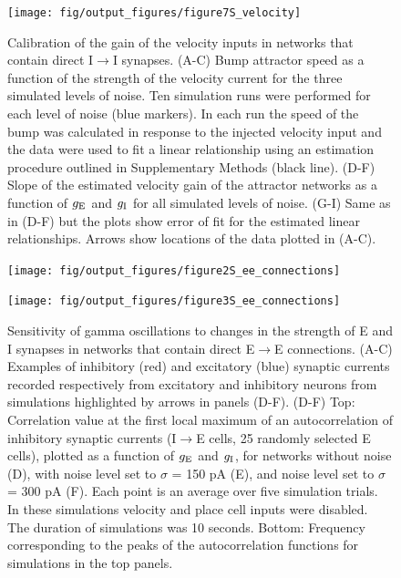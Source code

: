 \documentclass[a4paper,12pt]{article}
\newcommand{\ssc}[3]{\ensuremath{#1_{\text{#2}_{\text{#3}}}}}
\newcommand{\gE      }{\ssc{g}      {\scriptsize{E}}{}}
\newcommand{\gI      }{\ssc{g}      {\scriptsize{I}}{}}
\begin{document}
\clearpage

\begin{figure}[ht!]
    \internallinenumbers
    \centering
        \texttt{[image: fig/output\_figures/figure7S\_velocity]}
    \caption{Calibration of the gain of the velocity inputs in networks that
    contain direct I$\rightarrow$I synapses. (A-C) Bump attractor speed as a
    function of the strength of the velocity current for the three simulated
    levels of noise. Ten simulation runs were performed for each level of noise
    (blue markers). In each run the speed of the bump was calculated in
    response to the injected velocity input and the data were used to fit a
    linear relationship using an estimation procedure outlined in Supplementary
    Methods (black line). (D-F) Slope of the estimated velocity gain of the
    attractor networks as a function of $\gE$ and $\gI$ for all simulated
    levels of noise. (G-I) Same as in (D-F) but the plots show error of fit for
    the estimated linear relationships. Arrows show locations of the data
    plotted in (A-C).}
\end{figure}

\clearpage

\begin{figure}[p]
    \internallinenumbers
    \centering
        \texttt{[image: fig/output\_figures/figure2S\_ee\_connections]}
    \caption{}
\end{figure}

\clearpage

\begin{figure}[p]
    \internallinenumbers
    \centering
        \texttt{[image: fig/output\_figures/figure3S\_ee\_connections]}
\end{figure}

\clearpage

\begin{figure}[H]
    \internallinenumbers
    \caption{Sensitivity of gamma oscillations to changes in the strength of E
    and I synapses in networks that contain direct E$\rightarrow$E connections.
    (A-C) Examples of inhibitory (red) and excitatory (blue) synaptic currents
    recorded respectively from excitatory and inhibitory neurons from
    simulations highlighted by arrows in panels (D-F).  (D-F) Top: Correlation
    value at the first local maximum of an autocorrelation of inhibitory
    synaptic currents (I$\rightarrow$E cells, 25 randomly selected E cells),
    plotted as a function of $\gE$ and $\gI$, for networks without noise (D), with
    noise level set to $\sigma$ = 150 pA (E), and noise level set to $\sigma$ =
    300 pA (F). Each point is an average over five simulation trials. In these
    simulations velocity and place cell inputs were disabled.  The duration of
    simulations was 10 seconds.  Bottom: Frequency corresponding to the peaks
    of the autocorrelation functions for simulations in the top panels.}
\end{figure}
\end{document}
